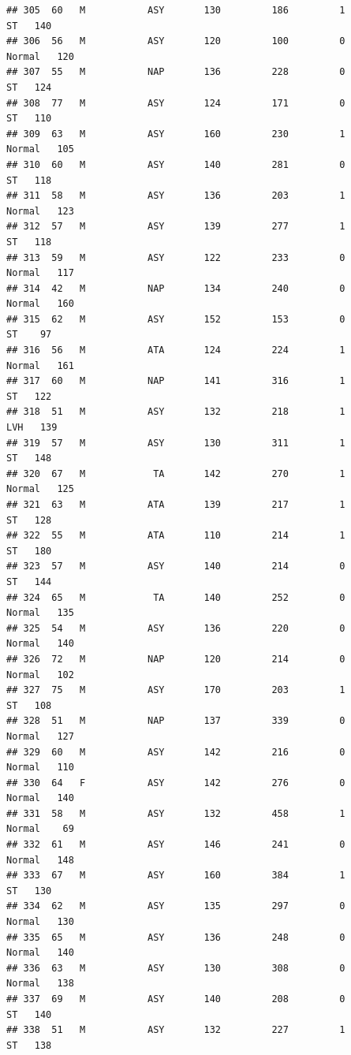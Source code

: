 \documentclass[
]{article}
\begin{document}
\begin{verbatim}
## 305  60   M           ASY       130         186         1         ST   140
## 306  56   M           ASY       120         100         0     Normal   120
## 307  55   M           NAP       136         228         0         ST   124
## 308  77   M           ASY       124         171         0         ST   110
## 309  63   M           ASY       160         230         1     Normal   105
## 310  60   M           ASY       140         281         0         ST   118
## 311  58   M           ASY       136         203         1     Normal   123
## 312  57   M           ASY       139         277         1         ST   118
## 313  59   M           ASY       122         233         0     Normal   117
## 314  42   M           NAP       134         240         0     Normal   160
## 315  62   M           ASY       152         153         0         ST    97
## 316  56   M           ATA       124         224         1     Normal   161
## 317  60   M           NAP       141         316         1         ST   122
## 318  51   M           ASY       132         218         1        LVH   139
## 319  57   M           ASY       130         311         1         ST   148
## 320  67   M            TA       142         270         1     Normal   125
## 321  63   M           ATA       139         217         1         ST   128
## 322  55   M           ATA       110         214         1         ST   180
## 323  57   M           ASY       140         214         0         ST   144
## 324  65   M            TA       140         252         0     Normal   135
## 325  54   M           ASY       136         220         0     Normal   140
## 326  72   M           NAP       120         214         0     Normal   102
## 327  75   M           ASY       170         203         1         ST   108
## 328  51   M           NAP       137         339         0     Normal   127
## 329  60   M           ASY       142         216         0     Normal   110
## 330  64   F           ASY       142         276         0     Normal   140
## 331  58   M           ASY       132         458         1     Normal    69
## 332  61   M           ASY       146         241         0     Normal   148
## 333  67   M           ASY       160         384         1         ST   130
## 334  62   M           ASY       135         297         0     Normal   130
## 335  65   M           ASY       136         248         0     Normal   140
## 336  63   M           ASY       130         308         0     Normal   138
## 337  69   M           ASY       140         208         0         ST   140
## 338  51   M           ASY       132         227         1         ST   138

\end{verbatim}
\end{document}
